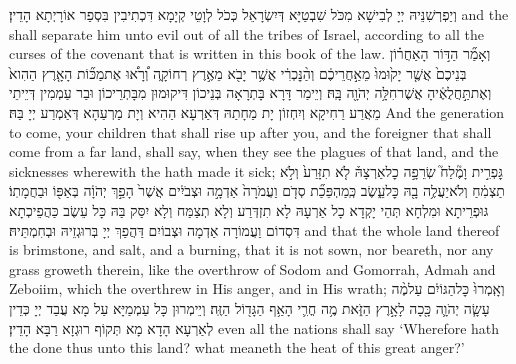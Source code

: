 {וְיַפְרְשִׁנֵּיהּ יְיָ לְבִישָׁא מִכֹּל שִׁבְטַיָּא דְּיִשְׂרָאֵל כְּכֹל לְוָטֵי קְיָמָא דִּכְתִיבִין בִּסְפַר אוֹרָיְתָא הָדֵין׃}
{and the \lord\space shall separate him unto evil out of all the tribes of Israel, according to all the curses of the covenant that is written in this book of the law.}{}
{וְאָמַ֞ר הַדּ֣וֹר הָאַחֲר֗וֹן בְּנֵיכֶם֙ אֲשֶׁ֤ר יָק֙וּמוּ֙ מֵאַ֣חֲרֵיכֶ֔ם וְהַ֨נׇּכְרִ֔י אֲשֶׁ֥ר יָבֹ֖א מֵאֶ֣רֶץ רְחוֹקָ֑ה וְ֠רָא֠וּ אֶת\maqqaf מַכּ֞וֹת הָאָ֤רֶץ הַהִוא֙ וְאֶת\maqqaf תַּ֣חֲלֻאֶ֔יהָ אֲשֶׁר\maqqaf חִלָּ֥ה יְהֹוָ֖ה בָּֽהּ׃}
{וְיֵימַר דָּרָא בָּתְרָאָה בְּנֵיכוֹן דִּיקוּמוּן מִבָּתְרֵיכוֹן וּבַר עַמְמִין דְּיֵיתֵי מֵאֲרַע רַחִיקָא וְיִחְזוֹן יָת מַחָתַהּ דְּאַרְעָא הַהִיא וְיָת מַרְעַהָא דְּאַמְרַע יְיָ בַּהּ׃}
{And the generation to come, your children that shall rise up after you, and the foreigner that shall come from a far land, shall say, when they see the plagues of that land, and the sicknesses wherewith the \lord\space hath made it sick;}{}
{גׇּפְרִ֣ית וָמֶ֘לַח֮ שְׂרֵפָ֣ה כׇל\maqqaf אַרְצָהּ֒ לֹ֤א תִזָּרַע֙ וְלֹ֣א תַצְמִ֔חַ וְלֹא\maqqaf יַעֲלֶ֥ה בָ֖הּ כׇּל\maqqaf עֵ֑שֶׂב כְּֽמַהְפֵּכַ֞ת סְדֹ֤ם וַעֲמֹרָה֙ אַדְמָ֣ה וּצְבֹיִ֔ים אֲשֶׁר֙ הָפַ֣ךְ יְהֹוָ֔ה בְּאַפּ֖וֹ וּבַחֲמָתֽוֹ׃}
{גּוּפְרֵיתָא וּמִלְחָא תְּהֵי יָקְדָא כָל אַרְעָהּ לָא תִזְדְּרַע וְלָא תְצַמַּח וְלָא יִסַּק בַּהּ כָּל עֵשֶׂב כַּהֲפֵיכְתָא דִּסְדוֹם וַעֲמוֹרָה אַדְמָה וּצְבוֹיִם דַּהֲפַךְ יְיָ בְּרוּגְזֵיהּ וּבְחִמְתֵּיהּ׃}
{and that the whole land thereof is brimstone, and salt, and a burning, that it is not sown, nor beareth, nor any grass groweth therein, like the overthrow of Sodom and Gomorrah, Admah and Zeboiim, which the \lord\space overthrew in His anger, and in His wrath;}{}
{וְאָֽמְרוּ֙ כׇּל\maqqaf הַגּוֹיִ֔ם עַל\maqqaf מֶ֨ה עָשָׂ֧ה יְהֹוָ֛ה כָּ֖כָה לָאָ֣רֶץ הַזֹּ֑את מֶ֥ה חֳרִ֛י הָאַ֥ף הַגָּד֖וֹל הַזֶּֽה׃}
{וְיֵימְרוּן כָּל עַמְמַיָּא עַל מָא עֲבַד יְיָ כְּדֵין לְאַרְעָא הָדָא מָא תְּקוֹף רוּגְזָא רַבָּא הָדֵין׃}
{even all the nations shall say ‘Wherefore hath the \lord\space done thus unto this land? what meaneth the heat of this great anger?’}{}
